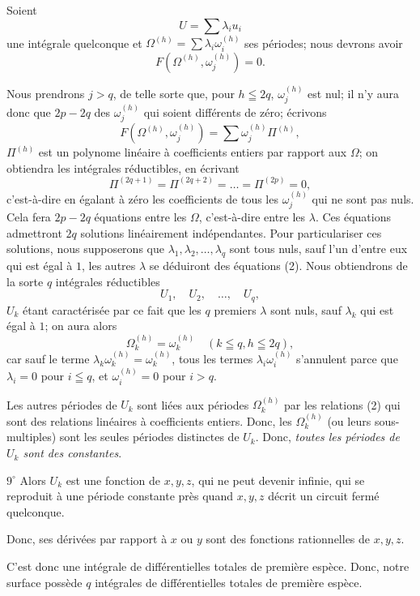 \documentclass{article}
\begin{document}
Soient
\[
U = \sum \lambda_{i} u_{i}
\]
une intégrale quelconque et $\Omega^{(h)} = \displaystyle\sum \lambda_{i} \omega_{i}^{(h)}$ ses périodes; nous devrons avoir
\[
F(\Omega^{(h)}, \omega_{j}^{(h)}) = 0.
\]

Nous prendrons $j > q$, de telle sorte que, pour $h \leqq 2q$, $\omega_{j}^{(h)}$ est nul; il n'y aura donc que $2p - 2q$ des $\omega_{j}^{(h)}$ qui soient différents de zéro;
écrivons
\[
F(\Omega^{(h)}, \omega_{j}^{(h)}) = \sum \omega_{j}^{(h)} \Pi^{(h)},
\]
$\Pi^{(h)}$ est un polynome linéaire à coefficients entiers par rapport aux $\Omega$; on obtiendra les intégrales réductibles, en écrivant
\[
\Pi^{(2q+1)} = \Pi^{(2q+2)} = \ldots = \Pi^{(2p)} = 0, \tag{2}
\]
c'est-à-dire en égalant à zéro les coefficients de tous les $\omega_{j}^{(h)}$ qui ne sont pas nuls. Cela fera $2p - 2q$ équations entre les $\Omega$, c'est-à-dire entre les $\lambda$. Ces équations admettront $2q$ solutions linéairement indépendantes. Pour particulariser ces solutions, nous supposerons que $\lambda_{1}, \lambda_{2}, \ldots, \lambda_{q}$ sont tous nuls, sauf l'un d'entre eux qui est égal à $1$, les autres $\lambda$ se déduiront des équations (2). Nous obtiendrons de la sorte $q$ intégrales réductibles
\[
U_{1}, \quad U_{2}, \quad \ldots, \quad U_{q},
\]
$U_{k}$ étant caractérisée par ce fait que les $q$ premiers $\lambda$ sont nuls, sauf $\lambda_{k}$ qui est égal à $1$; on aura alors
\[
\Omega_{k}^{(h)} = \omega_{k}^{(h)} \quad (k \leqq q, h \leqq 2q),
\]
car sauf le terme $\lambda_{k} \omega_{k}^{(h)} = \omega_{k}^{(h)}$, tous les termes $\lambda_{i} \omega_{i}^{(h)}$ s'annulent parce que $\lambda_{i} = 0$ pour $i \leqq q$, et $\omega_{i}^{(h)} = 0$ pour $i > q$.

Les autres périodes de $U_{k}$ sont liées aux périodes $\Omega_{k}^{(h)}$ par les relations (2) qui sont des relations linéaires à coefficients entiers. Donc, les $\Omega_{k}^{(h)}$ (ou leurs sous-multiples) sont les seules périodes distinctes de $U_{k}$. Donc, \emph{toutes les périodes de $U_{k}$ sont des constantes}.

$9^\circ$ Alors $U_{k}$ est une fonction de $x, y, z$, qui ne peut devenir infinie, qui se reproduit à une période constante près quand $x, y, z$ décrit un circuit fermé quelconque.

Donc, ses dérivées par rapport à $x$ ou $y$ sont des fonctions rationnelles de $x, y, z$.

C'est donc une intégrale de différentielles totales de première espèce. Donc, notre surface possède $q$ intégrales de différentielles totales de première espèce.
\end{document}
